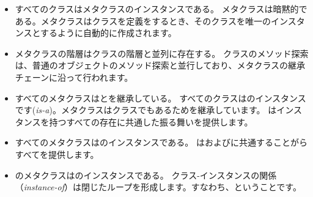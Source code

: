 \documentclass[a4paper,10pt,twoside]{book}
\begin{document}
\begin{itemize}
\item すべてのクラスはメタクラスのインスタンスである。
	メタクラスは暗黙的である。メタクラスはクラスを定義をするとき、そのクラスを唯一のインスタンスとするように自動的に作成されます。

\item メタクラスの階層はクラスの階層と並列に存在する。
	クラスのメソッド探索は、普通のオブジェクトのメソッド探索と並行しており、メタクラスの継承チェーンに沿って行われます。

\item すべてのメタクラスはとを継承している。
	すべてのクラスはのインスタンスです(\emph{is-a})。メタクラスはクラスでもあるためを継承しています。
	はインスタンスを持つすべての存在に共通した振る舞いを提供します。

\item すべてのメタクラスはのインスタンスである。
	はおよびに共通することがらすべてを提供します。

\item {}のメタクラスはのインスタンスである。
	クラス-インスタンスの関係（\emph{instance-of}）は閉じたループを形成します。すなわち、ということです。
\end{itemize}
\ifx\wholebook\relax\else
\end{document}
